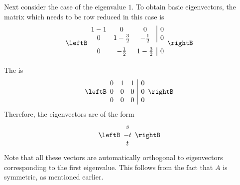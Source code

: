 \begin{solution}
Next consider the case of the eigenvalue $1$. To obtain basic eigenvectors, the matrix which needs to be
row reduced in this case is 
\begin{equation*}
\leftB 
\begin{array}{ccc|c}
1-1 & 0 & 0 & 0 \\ 
0 & 1-\vspace{0.05in}\frac{3}{2} & -\vspace{0.05in}\frac{1}{2} & 0 \\ 
0 & -\vspace{0.05in}\frac{1}{2} & 1-\vspace{0.05in}\frac{3}{2} & 0
\end{array}
\rightB
\end{equation*}
The \rref \;is 
\begin{equation*}
\leftB 
\begin{array}{rrr|r}
0 & 1 & 1 & 0 \\ 
0 & 0 & 0 & 0 \\ 
0 & 0 & 0 & 0
\end{array}
\rightB 
\end{equation*}
Therefore, the eigenvectors are of the form 
\begin{equation*}
\leftB 
\begin{array}{c}
s \\ 
-t \\ 
t
\end{array}
\rightB 
\end{equation*}
Note that all these vectors are automatically orthogonal to
eigenvectors corresponding to the first eigenvalue. This follows from the fact that $A$
is symmetric, as mentioned earlier.


\end{solution}
